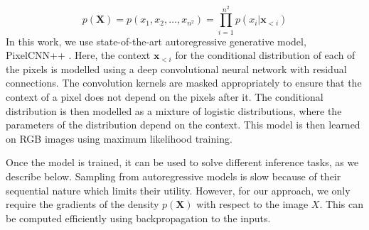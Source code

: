 \documentclass[journal,twoside]{IEEEtran}
\newcommand{\X}{\mathbf{X}}
\newcommand{\x}{\mathbf{x}}
\begin{document}
\begin{equation}
    p(\X) = p(x_1,x_2,\dots,x_{n^2}) = \prod_{i = 1}^{n^2} p(x_i|\x_{<i})
\end{equation}
In this work, we use state-of-the-art autoregressive generative model, PixelCNN++ \cite{salimans2017pixelcnn++}. Here, the context $\mathbf{x}_{<i}$ for the conditional distribution of each of the pixels is modelled using a deep convolutional neural network with residual connections. The convolution kernels are masked appropriately to ensure that the context of a pixel does not depend on the pixels after it. The conditional distribution is then modelled as a mixture of logistic distributions, where the parameters of the distribution depend on the context. This model is then learned on RGB images using maximum likelihood training.

Once the model is trained, it can be used to solve different inference tasks, as we describe below. Sampling from autoregressive models is slow because of their sequential nature which limits their utility. However, for our approach, we only require the gradients of the density $p(\X)$ with respect to the image $X$. This can be computed efficiently using backpropagation to the inputs.

\end{document}
